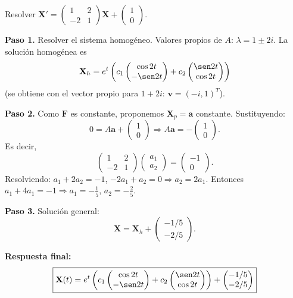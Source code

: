 \begin{example}
Resolver $\mathbf{X}'=
\begin{pmatrix}
1&2\\
-2&1
\end{pmatrix}\mathbf{X}
+
\begin{pmatrix}
1\\0
\end{pmatrix}$.
\begin{myproof}
\textbf{Paso 1.} Resolver el sistema homogéneo. Valores propios de $A$: $\lambda=1\pm2i$. La solución homogénea es
\[
\mathbf{X}_h=e^t\left(c_1
\begin{pmatrix}
\cos 2t\\-\sen 2t
\end{pmatrix}
+c_2
\begin{pmatrix}
\sen 2t\\ \cos 2t
\end{pmatrix}\right)
\]
(se obtiene con el vector propio para $1+2i$: $\mathbf{v}=(-i,1)^T$).

\textbf{Paso 2.} Como $\mathbf{F}$ es constante, proponemos $\mathbf{X}_p=\mathbf{a}$ constante. Sustituyendo:
\[
0=A\mathbf{a}+\begin{pmatrix}1\\0\end{pmatrix}\Rightarrow A\mathbf{a}=-\begin{pmatrix}1\\0\end{pmatrix}.
\]
Es decir,
\[
\begin{pmatrix}
1&2\\
-2&1
\end{pmatrix}
\begin{pmatrix}
a_1\\a_2
\end{pmatrix}
=
\begin{pmatrix}
-1\\0
\end{pmatrix}.
\]
Resolviendo: $a_1+2a_2=-1$, $-2a_1+a_2=0\Rightarrow a_2=2a_1$. Entonces $a_1+4a_1=-1\Rightarrow a_1=-\frac15$, $a_2=-\frac25$.

\textbf{Paso 3.} Solución general:
\[
\mathbf{X}=\mathbf{X}_h+\begin{pmatrix}-1/5\\-2/5\end{pmatrix}.
\]

\textbf{Respuesta final:}
\[
\boxed{
\mathbf{X}(t)=e^t\left(c_1
\begin{pmatrix}
\cos 2t\\-\sen 2t
\end{pmatrix}
+c_2
\begin{pmatrix}
\sen 2t\\ \cos 2t
\end{pmatrix}\right)
+
\begin{pmatrix}
-1/5\\-2/5
\end{pmatrix}
}
\]
\end{myproof}
\end{example}

